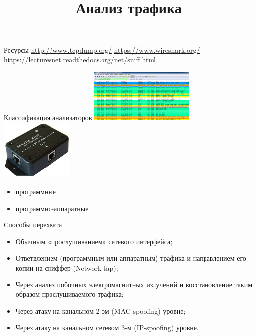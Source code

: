 

\title{Анализ трафика}



\frame{\titlepage}

\begin{frame}{Ресурсы}
    \url{http://www.tcpdump.org/}\newline
    \url{https://www.wireshark.org/}\newline
    \url{https://lecturesnet.readthedocs.org/net/sniff.html}
\end{frame}

\begin{frame}{Классификация анализаторов}
    \includegraphics[width=2in]{media/wireshark.png}\;
    \includegraphics[width=1.4in]{media/shark-hw.jpg}
    \begin{itemize}
        \item программные
        \item программно-аппаратные
    \end{itemize}
\end{frame}

\begin{frame}{Способы перехвата}
    \begin{itemize}
        \item Обычным «прослушиванием» сетевого интерфейса;

        \item Ответвлением (программным или аппаратным) трафика и направлением
            его копии на сниффер (Network tap);

        \item Через анализ побочных электромагнитных излучений и восстановление
            таким образом прослушиваемого трафика;

        \item Через атаку на канальном 2-ом (MAC-spoofing) уровне;
            
        \item Через атаку на канальном сетевом 3-м (IP-spoofing) уровне.
    \end{itemize}
\end{frame}

